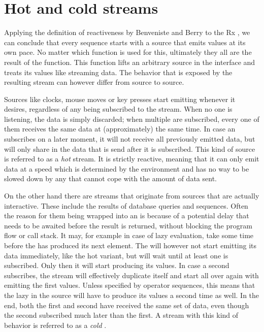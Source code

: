 \section{Hot and cold streams}
Applying the definition of reactiveness by Benveniste and Berry\cite{berry1991-Reactive} to the Rx \obs, we can conclude that every \obs sequence starts with a source that emits values at its own pace. No matter which function is used for this, ultimately they all are the result of the  function. This function lifts an arbitrary source in the \obs interface and treats its values like streaming data. The behavior that is exposed by the resulting stream can however differ from source to source.

Sources like clocks, mouse moves or key presses start emitting whenever it desires, regardless of any \obv being subscribed to the stream. When no one is listening, the data is simply discarded; when multiple \obv are subscribed, every one of them receives the same data at (approximately) the same time. In case an \obv subscribes on a later moment, it will not receive all previously emitted data, but will only share in the data that is send after it is subscribed. This kind of source is referred to as a \textit{hot} stream. It is strictly reactive, meaning that it can only emit data at a speed which is determined by the environment and has no way to be slowed down by any \obv that cannot cope with the amount of data sent.

On the other hand there are streams that originate from sources that are actually interactive. These include the results of database queries and \ieb sequences. Often the reason for them being wrapped into an \obs is because of a potential delay that needs to be awaited before the result is returned, without blocking the program flow or call stack. It may, for example in case of lazy evaluation, take some time before the \ier has produced its next element. The \obs will however not start emitting its data immediately, like the hot variant, but will wait until at least one \obv is subscribed. Only then it will start producing its values. In case a second \obv subscribes, the stream will effectively duplicate itself and start all over again with emitting the first values. Unless specified by operator sequences, this means that the lazy \ier in the source will have to produce its values a second time as well. In the end, both the first and second \obv have received the same set of data, even though the second subscribed much later than the first. A stream with this kind of behavior is referred to as a \textit{cold} \obs.

